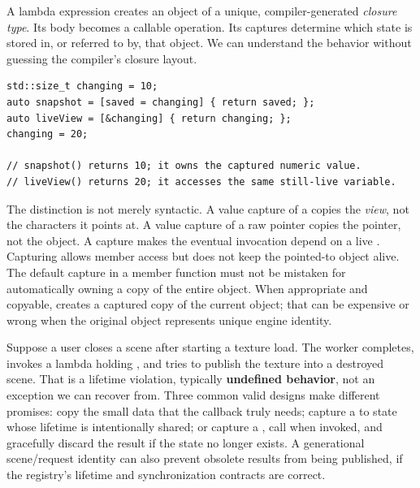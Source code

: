 \hypertarget{05-engine-i-ch004-a-lambda-is-a-created-object-and-its-capture-is-a-lifetime-contract}{}

A lambda expression creates an object of a unique, compiler-generated \emph{closure type}. Its body becomes a callable operation. Its captures determine which state is stored in, or referred to by, that object. We can understand the behavior without guessing the compiler's closure layout.

\begin{verbatim}
std::size_t changing = 10;
auto snapshot = [saved = changing] { return saved; };
auto liveView = [&changing] { return changing; };
changing = 20;

// snapshot() returns 10; it owns the captured numeric value.
// liveView() returns 20; it accesses the same still-live variable.
\end{verbatim}

The distinction is not merely syntactic. A value capture of a  copies the \emph{view}, not the characters it points at. A value capture of a raw pointer copies the pointer, not the object. A \BookInlineCode{{{[}}{\&}{s}{c}{e}{n}{e}{{]}}}{{[}\&scene{]}} capture makes the eventual invocation depend on a live . Capturing  allows member access but does not keep the pointed-to object alive. The \BookInlineCode{{{[}}{=}{{]}}}{{[}={]}} default capture in a member function must not be mistaken for automatically owning a copy of the entire object. When appropriate and copyable, \BookInlineCode{{{[}}{*}{t}{h}{i}{s}{{]}}}{{[}*this{]}} creates a captured copy of the current object; that can be expensive or wrong when the original object represents unique engine identity.

Suppose a user closes a scene after starting a texture load. The worker completes, invokes a lambda holding \BookInlineCode{{{[}}{\&}{s}{c}{e}{n}{e}{{]}}}{{[}\&scene{]}}, and tries to publish the texture into a destroyed scene. That is a lifetime violation, typically \textbf{undefined behavior}, not an exception we can recover from. Three common valid designs make different promises: copy the small data that the callback truly needs; capture a  to state whose lifetime is intentionally shared; or capture a , call  when invoked, and gracefully discard the result if the state no longer exists. A generational scene/request identity can also prevent obsolete results from being published, if the registry's lifetime and synchronization contracts are correct.

